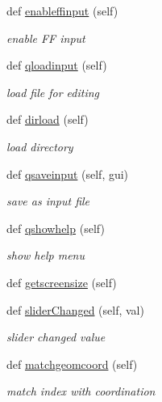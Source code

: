 \begin{DoxyCompactItemize}
def \hyperlink{classmolSimplify_1_1Classes_1_1mGUI_1_1mGUI_ae168544d1b6a60d3e6e3164307be16a2}{enableffinput} (self)
\begin{DoxyCompactList}\small\item\em enable FF input \end{DoxyCompactList}\item 
def \hyperlink{classmolSimplify_1_1Classes_1_1mGUI_1_1mGUI_a7f593807002a70b2a707d838d2200033}{qloadinput} (self)
\begin{DoxyCompactList}\small\item\em load file for editing \end{DoxyCompactList}\item 
def \hyperlink{classmolSimplify_1_1Classes_1_1mGUI_1_1mGUI_abde11108b135baabcf9009d005bdc717}{dirload} (self)
\begin{DoxyCompactList}\small\item\em load directory \end{DoxyCompactList}\item 
def \hyperlink{classmolSimplify_1_1Classes_1_1mGUI_1_1mGUI_aba103fc4538846bc7cf145fa214e9257}{qsaveinput} (self, gui)
\begin{DoxyCompactList}\small\item\em save as input file \end{DoxyCompactList}\item 
def \hyperlink{classmolSimplify_1_1Classes_1_1mGUI_1_1mGUI_a8412fed5edb7de2b80ba7e348c9fdcea}{qshowhelp} (self)
\begin{DoxyCompactList}\small\item\em show help menu \end{DoxyCompactList}\item 
def \hyperlink{classmolSimplify_1_1Classes_1_1mGUI_1_1mGUI_a63da7b72868600a02558c1506168a560}{getscreensize} (self)
\item 
def \hyperlink{classmolSimplify_1_1Classes_1_1mGUI_1_1mGUI_ad728d036650ebdf101942bea8364818a}{slider\+Changed} (self, val)
\begin{DoxyCompactList}\small\item\em slider changed value \end{DoxyCompactList}\item 
def \hyperlink{classmolSimplify_1_1Classes_1_1mGUI_1_1mGUI_aba7b85f8075d80a83c4ba4174470d463}{matchgeomcoord} (self)
\begin{DoxyCompactList}\small\item\em match index with coordination \end{DoxyCompactList}\item 

\end{DoxyCompactItemize}
